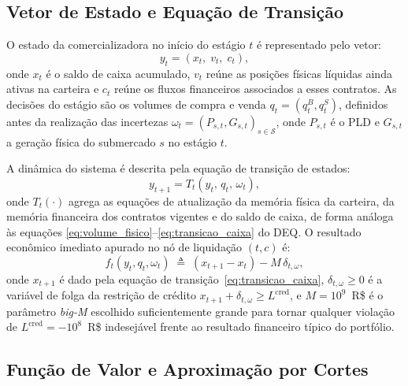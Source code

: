 \subsection{Vetor de Estado e Equa\c{c}\~ao de Transi\c{c}\~ao}
\label{subsec:estado_transicao}

O estado da comercializadora no in\'icio do est\'agio $t$ \'e representado pelo vetor:
%
\begin{equation}
  y_t = (x_t,\; v_t,\; c_t),
  \label{eq:vetor_estado}
\end{equation}
%
onde $x_t$ \'e o saldo de caixa acumulado, $v_t$ re\'une as posi\c{c}\~oes f\'isicas l\'iquidas ainda ativas na carteira e $c_t$ re\'une os fluxos financeiros associados a esses contratos. As decis\~oes do est\'agio s\~ao os volumes de compra e venda $q_t = (q^B_t, q^S_t)$, definidos antes da realiza\c{c}\~ao das incertezas $\omega_t = (P_{s,t}, G_{s,t})_{s \in \mathcal{S}}$, onde $P_{s,t}$ \'e o PLD e $G_{s,t}$ a gera\c{c}\~ao f\'isica do submercado $s$ no est\'agio $t$.

A din\^amica do sistema \'e descrita pela equa\c{c}\~ao de transi\c{c}\~ao de estados:
%
\begin{equation}
  y_{t+1} = T_t(y_t,\, q_t,\, \omega_t),
  \label{eq:transicao_estado}
\end{equation}
%
onde $T_t(\cdot)$ agrega as equa\c{c}\~oes de atualiza\c{c}\~ao da mem\'oria f\'isica da carteira, da mem\'oria financeira dos contratos vigentes e do saldo de caixa, de forma an\'aloga \`as equa\c{c}\~oes \eqref{eq:volume_fisico}--\eqref{eq:transicao_caixa} do DEQ. O resultado econ\^omico imediato apurado no n\'o de liquida\c{c}\~ao $(t, c)$ \'e:
%
\begin{equation}
  f_t(y_t, q_t, \omega_t)
  \;\triangleq\; (x_{t+1} - x_t) - M\,\delta_{t,\omega},
  \label{eq:ft_def}
\end{equation}
%
onde $x_{t+1}$ \'e dado pela equa\c{c}\~ao de transi\c{c}\~ao~\eqref{eq:transicao_caixa}, $\delta_{t,\omega} \geq 0$ \'e a vari\'avel de folga da restri\c{c}\~ao de cr\'edito $x_{t+1} + \delta_{t,\omega} \geq L^{\text{cred}}$, e $M = 10^9$~R\$ \'e o par\^ametro \emph{big-M} escolhido suficientemente grande para tornar qualquer viola\c{c}\~ao de $L^{\text{cred}} = -10^8$~R\$ indesej\'avel frente ao resultado financeiro t\'ipico do portf\'olio.

\subsection{Fun\c{c}\~ao de Valor e Aproxima\c{c}\~ao por Cortes}
\label{subsec:funcao_valor}

